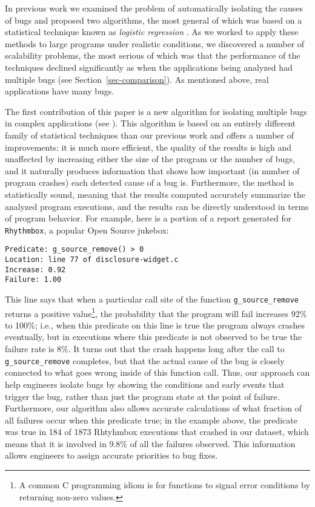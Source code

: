 \documentclass{sig-alternate}
\begin{document}
In previous work we examined the problem of automatically isolating
the causes of bugs and proposed two algorithms, the most general of
which was based on a statistical technique known as {\em logistic
regression} \cite{PLDI`03*141,Zheng:2003:SDSP}.  As we worked to apply
these methods to large programs under realistic conditions, we
discovered a number of scalability problems, the most serious of which
was that the performance of the techniques declined significantly as
when the applications being analyzed had multiple bugs (see
Section~\ref{sec-comparison}).  As mentioned above, real applications
have many bugs.

The first contribution of this paper is a new algorithm for isolating
multiple bugs in complex applications (see ).  This algorithm 
is based on an entirely different family of statistical techniques than our previous work and offers
a number of improvements:
it is much more efficient, the quality of the
results is high and unaffected by increasing either the size of the program
or the number of bugs, and it naturally produces information
that shows how important (in number of program crashes) each detected
cause of a bug is.  Furthermore, the method is statistically sound, meaning that
the results computed accurately summarize the analyzed program 
executions, and the results can be directly understood in terms of program behavior.
For example, here is a portion of a report generated for {\tt Rhythmbox},
a popular Open Source jukebox:
\begin{verbatim}
Predicate: g_source_remove() > 0 
Location: line 77 of disclosure-widget.c
Increase: 0.92   
Failure: 1.00   
\end{verbatim}
This line says that when a particular call site of the function {\tt g\_source\_remove} returns a 
positive value\footnote{A common C programming idiom is for functions to signal error conditions by returning non-zero values.}, the probability that the program will fail 
increases 92\% to 100\%; i.e., when this predicate on this line is true the program always crashes eventually, but in executions where this predicate is not
observed to be true the failure rate is 8\%.  It turns out that the crash happens long after the call to {\tt g\_source\_remove} completes,
but that the actual cause of the bug is closely connected to what goes wrong inside of this function call.  Thus,
our approach can help engineers isolate bugs by showing the conditions and early events that trigger the bug, rather than just the
program state at the point of failure.  Furthermore, our algorithm also allows accurate calculations of what fraction of all failures occur when this predicate
true; in the example above, the predicate was true in 184 of 1873 Rhtyhmbox executions that crashed in our dataset, which means that
it is involved in 9.8\% of all the failures observed.  This information allows engineers to assign accurate priorities to bug fixes.
\end{document}
